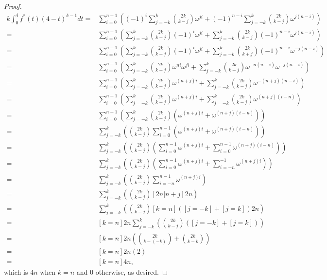 \documentclass{article}
\begin{document}
\begin{proof}
  \begin{align*}
  k\int_0^4f^*(t)(4-t)^{k-1}dt =& \sum_{i=0}^{n-1} \left((-1)^i\sum_{j=-k}^k\binom{2k}{k-j}\omega^{ji} + (-1)^{n-i}\sum_{j=-k}^k\binom{2k}{k-j}\omega^{j(n-i)}\right) \\
  =& \sum_{i=0}^{n-1} \left(\sum_{j=-k}^k\binom{2k}{k-j}(-1)^i\omega^{ji} + \sum_{j=-k}^k\binom{2k}{k-j}(-1)^{n-i}\omega^{j(n-i)}\right) \\
  =& \sum_{i=0}^{n-1} \left(\sum_{j=-k}^k\binom{2k}{k-j}(-1)^i\omega^{ji} + \sum_{j=-k}^k\binom{2k}{k+j}(-1)^{n-i}\omega^{-j(n-i)}\right) \\
  =& \sum_{i=0}^{n-1} \left(\sum_{j=-k}^k\binom{2k}{k-j}\omega^{ni}\omega^{ji} + \sum_{j=-k}^k\binom{2k}{k-j}\omega^{-n(n-i)}\omega^{-j(n-i)}\right) \\
  =& \sum_{i=0}^{n-1} \left(\sum_{j=-k}^k\binom{2k}{k-j}\omega^{(n+j)i} + \sum_{j=-k}^k\binom{2k}{k-j}\omega^{-(n+j)(n-i)}\right) \\
  =& \sum_{i=0}^{n-1} \left(\sum_{j=-k}^k\binom{2k}{k-j}\omega^{(n+j)i} + \sum_{j=-k}^k\binom{2k}{k-j}\omega^{(n+j)(i-n)}\right) \\
  =& \sum_{i=0}^{n-1} \left(\sum_{j=-k}^k\binom{2k}{k-j}\left(\omega^{(n+j)i} + \omega^{(n+j)(i-n)}\right)\right) \\
  =& \sum_{j=-k}^k \left(\binom{2k}{k-j}\sum_{i=0}^{n-1}\left(\omega^{(n+j)i} + \omega^{(n+j)(i-n)}\right)\right) \\
  =& \sum_{j=-k}^k \left(\binom{2k}{k-j}\left(\sum_{i=0}^{n-1}\omega^{(n+j)i} + \sum_{i=0}^{n-1}\omega^{(n+j)(i-n)}\right)\right) \\
  =& \sum_{j=-k}^k \left(\binom{2k}{k-j}\left(\sum_{i=0}^{n-1}\omega^{(n+j)i} + \sum_{i=-n}^{-1}\omega^{(n+j)i}\right)\right) \\
  =& \sum_{j=-k}^k \left(\binom{2k}{k-j}\sum_{i=-n}^{n-1}\omega^{(n+j)i}\right) \\
  =& \sum_{j=-k}^k \left(\binom{2k}{k-j}[2n|n+j]2n\right) \\
  =& \sum_{j=-k}^k \left(\binom{2k}{k-j}[k=n]([j=-k]+[j=k])2n\right) \\
  =& [k=n]2n\sum_{j=-k}^k \left(\binom{2k}{k-j}([j=-k]+[j=k])\right) \\
  =& [k=n]2n\left(\binom{2k}{k-(-k)}+\binom{2k}{k-k}\right) \\
  =& [k=n]2n(2) \\
  =& [k=n]4n,
  \end{align*}
  which is $4n$ when $k=n$ and $0$ otherwise, as desired.
\end{proof}
\newpage
\end{document}
